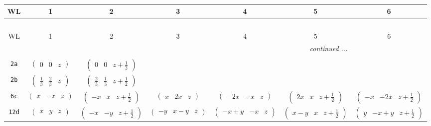 \documentclass[fleqn,9pt,landscape]{jsarticle}
\begin{document}
\begin{center}
\renewcommand{\arraystretch}{1.2}
\begin{longtable}{ccccccc}
 \hline \hline
WL & 1 & 2 & 3 & 4 & 5 & 6 \\ \hline \endfirsthead

\multicolumn{6}{l}{\tablename\ \thetable{}} \\
 \hline \hline
WL & 1 & 2 & 3 & 4 & 5 & 6 \\ \hline \endhead

 \hline \hline
\multicolumn{6}{r}{\footnotesize\it continued ...} \\ \endfoot

 \hline \hline
\multicolumn{6}{r}{} \\ \endlastfoot

{\tt 2a} & $ \begin{pmatrix} 0 & 0 & z \end{pmatrix} $ & $ \begin{pmatrix} 0 & 0 & z + \frac{1}{2} \end{pmatrix} $ & $  $ & $  $ & $  $ & $  $ \\ \hline
{\tt 2b} & $ \begin{pmatrix} \frac{1}{3} & \frac{2}{3} & z \end{pmatrix} $ & $ \begin{pmatrix} \frac{2}{3} & \frac{1}{3} & z + \frac{1}{2} \end{pmatrix} $ & $  $ & $  $ & $  $ & $  $ \\ \hline
{\tt 6c} & $ \begin{pmatrix} x & - x & z \end{pmatrix} $ & $ \begin{pmatrix} - x & x & z + \frac{1}{2} \end{pmatrix} $ & $ \begin{pmatrix} x & 2 x & z \end{pmatrix} $ & $ \begin{pmatrix} - 2 x & - x & z \end{pmatrix} $ & $ \begin{pmatrix} 2 x & x & z + \frac{1}{2} \end{pmatrix} $ & $ \begin{pmatrix} - x & - 2 x & z + \frac{1}{2} \end{pmatrix} $ \\ \hline
{\tt 12d} & $ \begin{pmatrix} x & y & z \end{pmatrix} $ & $ \begin{pmatrix} - x & - y & z + \frac{1}{2} \end{pmatrix} $ & $ \begin{pmatrix} - y & x - y & z \end{pmatrix} $ & $ \begin{pmatrix} - x + y & - x & z \end{pmatrix} $ & $ \begin{pmatrix} x - y & x & z + \frac{1}{2} \end{pmatrix} $ & $ \begin{pmatrix} y & - x + y & z + \frac{1}{2} \end{pmatrix} $ \\

\end{longtable}
\end{center}
\end{document}
